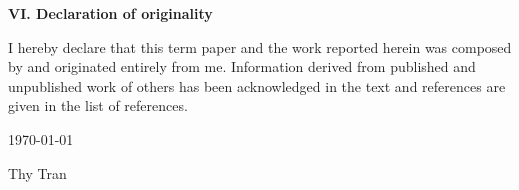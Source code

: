 \thispagestyle{plain}
\textbf{VI. Declaration of originality}

\vspace{6pt}

I hereby declare that this term paper and the work reported herein was composed by and originated entirely from me. Information derived from published and unpublished work of others has been acknowledged in the text and references are given in the list of references. 

\begin{flushright}
	\today

	Thy Tran
\end{flushright}

